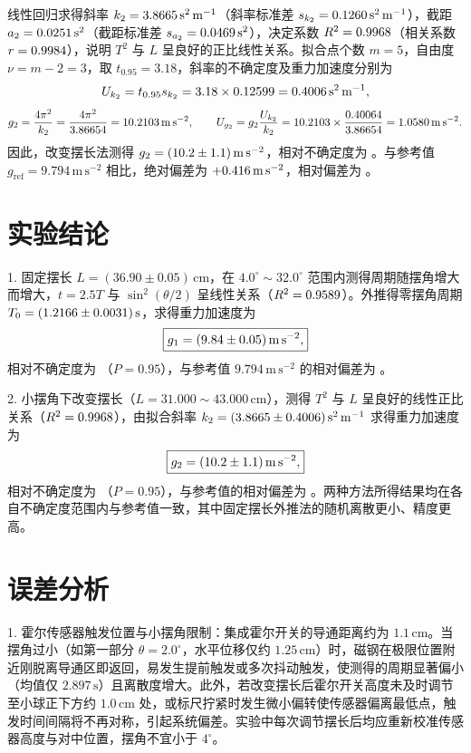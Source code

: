 \documentclass[12pt,a4paper,fontset=fandol]{ctexart}
\begin{document}
线性回归求得斜率 $k_2=3.8665\,\mathrm{s^2\,m^{-1}}$（斜率标准差 $s_{k_2}=0.1260\,\mathrm{s^2\,m^{-1}}$），截距 $a_2=0.0251\,\mathrm{s^2}$（截距标准差 $s_{a_2}=0.0469\,\mathrm{s^2}$），决定系数 $R^2=0.9968$（相关系数 $r=0.9984$），说明 $T^2$ 与 $L$ 呈良好的正比线性关系。拟合点个数 $m=5$，自由度 $\nu=m-2=3$，取 $t_{0.95}=3.18$，斜率的不确定度及重力加速度分别为
\[
U_{k_2}=t_{0.95}s_{k_2}=3.18\times0.12599=0.4006\,\mathrm{s^2\,m^{-1}},
\]
\[
g_2=\frac{4\pi^2}{k_2}=\frac{4\pi^2}{3.86654}=10.2103\,\mathrm{m\,s^{-2}},\qquad
U_{g_2}=g_2\frac{U_{k_2}}{k_2}
=10.2103\times\frac{0.40064}{3.86654}=1.0580\,\mathrm{m\,s^{-2}}.
\]
因此，改变摆长法测得 $g_2=(10.2\pm 1.1)\,\mathrm{m\,s^{-2}}$，相对不确定度为 \PartTwoGRelU。与参考值 $g_{\mathrm{ref}}=9.794\,\mathrm{m\,s^{-2}}$ 相比，绝对偏差为 $+0.416\,\mathrm{m\,s^{-2}}$，相对偏差为 \PartTwoGRelDiff。

\section{实验结论}
1. 固定摆长 $L=(36.90\pm0.05)\,\mathrm{cm}$，在 $4.0^\circ\sim32.0^\circ$ 范围内测得周期随摆角增大而增大，$t=2.5T$ 与 $\sin^2(\theta/2)$ 呈线性关系（$R^2=0.9589$）。外推得零摆角周期 $T_0=(1.2166\pm 0.0031)\,\mathrm s$，求得重力加速度为
\[
\boxed{g_1=(9.84\pm 0.05)\,\mathrm{m\,s^{-2}},}
\]
相对不确定度为 \PartOneGRelU（$P=0.95$），与参考值 $9.794\,\mathrm{m\,s^{-2}}$ 的相对偏差为 \PartOneGRelDiff。

2. 小摆角下改变摆长（$L=31.000\sim43.000\,\mathrm{cm}$），测得 $T^2$ 与 $L$ 呈良好的线性正比关系（$R^2=0.9968$），由拟合斜率 $k_2=(3.8665\pm0.4006)\,\mathrm{s^2\,m^{-1}}$ 求得重力加速度为
\[
\boxed{g_2=(10.2\pm 1.1)\,\mathrm{m\,s^{-2}},}
\]
相对不确定度为 \PartTwoGRelU（$P=0.95$），与参考值的相对偏差为 \PartTwoGRelDiff。两种方法所得结果均在各自不确定度范围内与参考值一致，其中固定摆长外推法的随机离散更小、精度更高。

\section{误差分析}
1. 霍尔传感器触发位置与小摆角限制：集成霍尔开关的导通距离约为 $1.1\,\mathrm{cm}$。当摆角过小（如第一部分 $\theta=2.0^\circ$，水平位移仅约 $1.25\,\mathrm{cm}$）时，磁钢在极限位置附近刚脱离导通区即返回，易发生提前触发或多次抖动触发，使测得的周期显著偏小（均值仅 $2.897\,\mathrm s$）且离散度增大。此外，若改变摆长后霍尔开关高度未及时调节至小球正下方约 $1.0\,\mathrm{cm}$ 处，或标尺拧紧时发生微小偏转使传感器偏离最低点，触发时间间隔将不再对称，引起系统偏差。实验中每次调节摆长后均应重新校准传感器高度与对中位置，摆角不宜小于 $4^\circ$。
\end{document}
